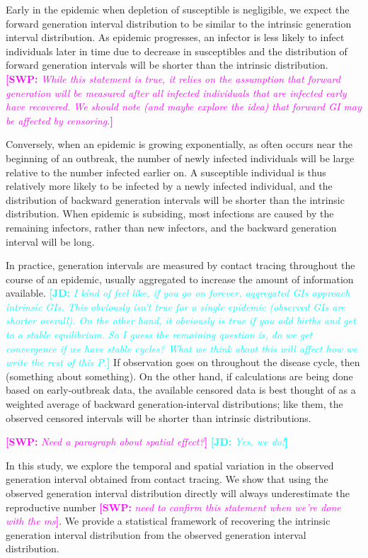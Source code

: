 \documentclass{article}
\newcommand{\comment}[3]{\textcolor{#1}{\textbf{[#2: }\textsl{#3}\textbf{]}}}
\newcommand{\jd}[1]{\comment{cyan}{JD}{#1}}
\newcommand{\swp}[1]{\comment{magenta}{SWP}{#1}}
\begin{document}
Early in the epidemic when depletion of susceptible is negligible, we expect the forward generation interval distribution to be similar to the intrinsic generation interval distribution.
As epidemic progresses, an infector is less likely to infect individuals later in time due to decrease in susceptibles and the distribution of forward generation intervals will be shorter than the intrinsic distribution.
\swp{While this statement is true, it relies on the assumption that forward generation will be measured after all infected individuals that are infected early have recovered. We should note (and maybe explore the idea) that forward GI may be affected by censoring.}

Conversely, when an epidemic is growing exponentially, as often occurs near the beginning of an outbreak, the number of newly infected individuals will be large relative to the number infected earlier on. 
A susceptible individual is thus relatively more likely to be infected by a newly infected individual, and the distribution of backward generation intervals will be shorter than the intrinsic distribution.
When epidemic is subsiding, most infections are caused by the remaining infectors, rather than new infectors, and the backward generation interval will be long.

In practice, generation intervals are measured by contact tracing throughout the course of an epidemic, usually aggregated to increase the amount of information available. 
\jd{I kind of feel like, if you go on forever, aggregated GIs approach intrinsic GIs. This obviously isn't true for a single epidemic (observed GIs are shorter overall). On the other hand, it obviously \emph{is} true if you add births and get to a stable equilibrium. So I guess the remaining question is, do we get convergence if we have stable cycles? What we think about this will affect how we write the rest of this P.} 
If observation goes on throughout the disease cycle, then (something about something).
On the other hand, if calculations are being done based on early-outbreak data, the available censored data is best thought of as a weighted average of backward generation-interval distributions; like them, the observed censored intervals will be shorter than intrinsic distributions.

\swp{Need a paragraph about spatial effect?}
\jd{Yes, we do!}

In this study, we explore the temporal and spatial variation in the observed generation interval obtained from contact tracing.
We show that using the observed generation interval distribution directly will always underestimate the reproductive number \swp{need to confirm this statement when we're done with the ms}. 
We provide a statistical framework of recovering the intrinsic generation interval distribution from the observed generation interval distribution.
\end{document}
